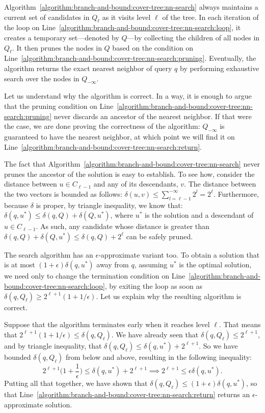 Algorithm~\ref{algorithm:branch-and-bound:cover-tree:nn-search} always maintains a current
set of candidates in $Q_\ell$ as it visits level $\ell$ of the tree. In each iteration of the
loop on Line~\ref{algorithm:branch-and-bound:cover-tree:nn-search:loop}, it creates a temporary
set---denoted by $Q$---by collecting the children of all nodes in $Q_\ell$. It then prunes the nodes
in $Q$ based on the condition on Line~\ref{algorithm:branch-and-bound:cover-tree:nn-search:pruning}.
Eventually, the algorithm returns the exact nearest neighbor of query $q$ by
performing exhaustive search over the nodes in $Q_{-\infty}$.

Let us understand why the algorithm is correct. In a way, it is enough to argue that
the pruning condition on Line~\ref{algorithm:branch-and-bound:cover-tree:nn-search:pruning}
never discards an ancestor of the nearest neighbor. If that were the case, we are done
proving the correctness of the algorithm: $Q_{-\infty}$ is guaranteed to have the nearest neighbor,
at which point we will find it on Line~\ref{algorithm:branch-and-bound:cover-tree:nn-search:return}.

The fact that Algorithm~\ref{algorithm:branch-and-bound:cover-tree:nn-search} never prunes
the ancestor of the solution is easy to establish.
To see how, consider the distance between $u \in C_{\ell-1}$ and any of its descendants, $v$.
The distance between the two vectors is bounded as follows:
$\delta(u, v) \leq \sum_{l = \ell - 1}^{-\infty} 2^l = 2^\ell$.
Furthermore, because $\delta$ is proper, by triangle inequality, we know
that: $\delta(q, u^\ast) \leq \delta(q, Q) + \delta(Q, u^\ast)$, where
$u^\ast$ is the solution and a descendant of $u \in C_{\ell - 1}$.
As such, any candidate whose distance is greater than
$\delta(q, Q) + \delta(Q, u^\ast) \leq \delta(q, Q) + 2^\ell$ can be safely
pruned.

\bigskip

The search algorithm has an $\epsilon$-approximate variant too.
To obtain a solution that is at most $(1 + \epsilon) \delta(q, u^\ast)$
away from $q$, assuming $u^\ast$ is the optimal solution, we need 
only to change the termination condition on Line~\ref{algorithm:branch-and-bound:cover-tree:nn-search:loop},
by exiting the loop as soon as $\delta(q, Q_{\ell}) \geq 2^{\ell + 1} (1 + 1/\epsilon)$.
Let us explain why the resulting algorithm is correct.

Suppose that the algorithm terminates early when it reaches level $\ell$.
That means that $2^{\ell + 1} (1 + 1/\epsilon) \leq \delta(q, Q_\ell)$.
We have already seen that $\delta(q, Q_\ell) \leq 2^{\ell + 1}$, and by triangle
inequality, that $\delta(q, Q_\ell) \leq \delta(q, u^\ast) + 2^{\ell + 1}$.
So we have bounded $\delta(q, Q_\ell)$ from below and above, resulting
in the following inequality:
\begin{equation*}
    2^{\ell + 1} \Big( 1 + \frac{1}{\epsilon} \Big) \leq \delta(q, u^\ast) + 
    2^{\ell + 1} \implies 2^{\ell + 1} \leq \epsilon \delta(q, u^\ast).
\end{equation*}
Putting all that together, we have shown that $\delta(q, Q_\ell) \leq (1 + \epsilon) \delta(q, u^\ast)$,
so that Line~\ref{algorithm:branch-and-bound:cover-tree:nn-search:return} returns an $\epsilon$-approximate
solution.

